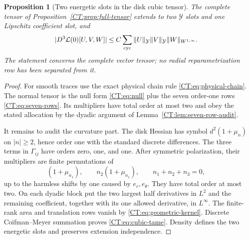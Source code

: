 \documentclass[11pt]{amsart}
\numberwithin{equation}{section}
\newtheorem{proposition}[theorem]{Proposition}
\theoremstyle{definition}
\theoremstyle{remark}
\newcommand{\Y}{\mathcal Y}
\begin{document}
\begin{proposition}[Two energetic slots in the disk cubic tensor]
\label{CT:prop:cubic-tame}
The complete tensor of Proposition~\ref{CT:prop:full-tensor} extends to two
$\Y$ slots and one Lipschitz coefficient slot, and
\begin{equation}\label{CT:eq:cubic-tame}
 |D^3\mathcal L(0)[U,V,W]|
 \le C\sum_{\rm cyc}
 \|U\|_\Y\|V\|_\Y\|W\|_{W^{1,\infty}}.
\end{equation}
The statement concerns the complete vector tensor; no radial
reparametrization row has been separated from it.
\end{proposition}

\begin{proof}
For smooth traces use the exact physical chain rule
\eqref{CT:eq:physical-chain}.  The normal tensor is the null form
\eqref{CT:eq:null} plus the seven order-one rows
\eqref{CT:eq:seven-rows}.  Its multipliers have total order at most two and
obey the stated allocation by the dyadic argument of
Lemma~\ref{CT:lem:seven-row-audit}.

It remains to audit the curvature part.  The disk Hessian has symbol
$d^2(1+\mu_n)$ on $|n|\ge2$, hence order one with the standard discrete
differences.  The three terms in $\Gamma_{ij}$ have orders zero, one, and
one.  After symmetric polarization, their multipliers are finite
permutations of
\begin{equation*}
 (1+\mu_{n_1}),\qquad
 n_2(1+\mu_{n_1}),
 \qquad n_1+n_2+n_3=0,
\end{equation*}
up to the harmless shifts by one caused by $e_r,e_\theta$.  They have
total order at most two.  On each dyadic block put the two largest half
derivatives in $L^2$ and the remaining coefficient, together with its one
allowed derivative, in $L^\infty$.  The finite-rank area and translation
rows vanish by \eqref{CT:eq:geometric-kernel}.  Discrete Coifman--Meyer
summation proves \eqref{CT:eq:cubic-tame}.  Density defines the two energetic
slots and preserves extension independence.
\end{proof}
\end{document}
